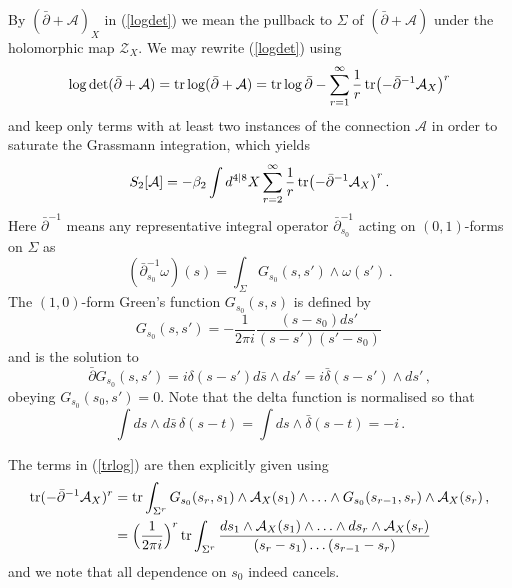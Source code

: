 \documentclass[12pt]{article}
\def \be  {\begin{equation}}
\def \ee  {\end{equation}}
\def \tr {\mathop{\rm tr}\nolimits}
\numberwithin{equation}{section}
\begin{document}
By $(\bar{\partial} + \mathcal{A})_X$ in (\ref{logdet}) we mean the pullback to $\Sigma$ of $(\bar{\partial} + \mathcal{A})$ under the holomorphic map $\mathcal{Z}_X$.
We may rewrite (\ref{logdet}) using 
\be
\log \det (\bar{\partial} + \mathcal A) = \tr \log (\bar{\partial} + \mathcal A) = \tr \log \bar{\partial} - \sum_{r=1}^\infty \frac{1}{r} \tr \bigl(-\bar{\partial}^{-1} \mathcal{A}_X\bigr)^r
\ee
and keep only terms with at least two instances of the connection $\mathcal{A}$ in order to saturate the Grassmann integration, which yields 
\be
S_2[\mathcal{A}] = -\beta_2 \int d^{4|8}X \sum_{r=2}^{\infty}\frac{1}{r} \tr \bigl(-\bar{\partial}^{-1} \mathcal{A}_X\bigr)^r\,.
\label{trlog}
\ee
Here $\bar{\partial}^{-1}$ means any representative integral operator $\bar{\partial}_{s_0}^{-1}$ acting on $(0,1)$-forms on $\Sigma$  as
\be
(\bar{\partial}_{s_0}^{-1} \omega)(s) = \int_{\Sigma} G_{s_0}(s,s') \wedge \omega(s')\,.
\label{dbarinv}
\ee
The $(1,0)$-form Green's function $G_{s_0}(s,s)$ is defined by
\be
G_{s_0}(s,s') = -\frac{1}{2\pi i} \frac{(s-s_0)ds'}{(s-s')(s'-s_0)}\,
\label{Greensfn}
\ee
and is the solution to
\be
\bar{\partial} G_{s_0}(s,s') = i \delta(s-s') d\bar{s} \wedge ds' = i\bar{\delta}(s-s') \wedge ds'\,,
\ee
obeying $G_{s_0}(s_0,s')=0$. Note that the delta function is normalised so that
\be
\int ds \wedge d\bar{s} \, \delta(s-t) = \int ds \wedge \bar{\delta}(s-t) = -i\,.
\ee

The terms in (\ref{trlog}) are then explicitly given using
\begin{align}
\tr (-\bar{\partial}^{-1} \mathcal{A}_X)^r &= \tr  \int_{\Sigma^r} G_{s_0}(s_r,s_1) \wedge \mathcal{A}_X(s_1) \wedge \ldots \wedge G_{s_0}(s_{r-1},s_r) \wedge \mathcal{A}_X(s_r) \,, \notag \\
&= \Bigl( \frac{1}{2\pi i} \Bigr)^r \tr \int_{\Sigma^r} \frac{ds_1 \wedge \mathcal{A}_X(s_1) \wedge \ldots \wedge ds_{r} \wedge \mathcal{A}_X(s_r)}{(s_r-s_1)\ldots(s_{r-1}-s_r)}
\end{align}
and we note that all dependence on $s_0$ indeed cancels.
\end{document}
